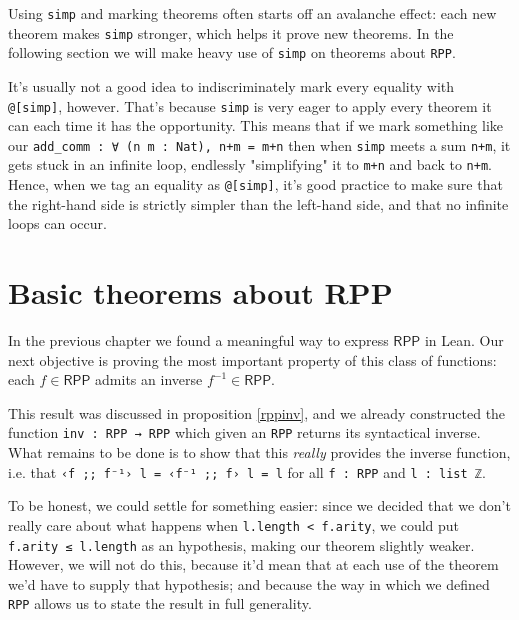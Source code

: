 \documentclass{book}
\theoremstyle{definition}
\theoremstyle{remark}
\theoremstyle{plain}
\newcommand{\RPP}{\mathsf{RPP}}
\begin{document}
Using \lstinline{simp} and marking theorems often starts off an avalanche effect:
each new theorem makes \lstinline{simp} stronger, which helps it prove new theorems.
In the following section we will make heavy use of \lstinline{simp} on theorems about \lstinline{RPP}.

It's usually not a good idea to indiscriminately mark every equality with \lstinline{@[simp]}, however.
That's because \lstinline{simp} is very eager to apply every theorem it can each time it has the opportunity.
This means that if we mark something like our \lstinline{add_comm : ∀ (n m : Nat), n+m = m+n}
then when \lstinline{simp} meets a sum \lstinline{n+m}, it gets stuck in an infinite loop,
endlessly "simplifying" it to \lstinline{m+n} and back to \lstinline{n+m}.
Hence, when we tag an equality as \lstinline{@[simp]},
it's good practice to make sure that the right-hand side is strictly simpler than the left-hand side,
and that no infinite loops can occur.

\section{Basic theorems about RPP}

In the previous chapter we found a meaningful way to express $\RPP$ in Lean.
Our next objective is proving the most important property of this class of functions:
each $f \in \RPP$ admits an inverse $f^{-1} \in \RPP$.

This result was discussed in proposition \ref{rppinv},
and we already constructed the function \lstinline{inv : RPP → RPP} which given an \lstinline{RPP} returns its syntactical inverse.
What remains to be done is to show that this \textit{really} provides the inverse function,
i.e. that \lstinline{‹f ;; f⁻¹› l = ‹f⁻¹ ;; f› l = l} for all \lstinline{f : RPP} and \lstinline{l : list ℤ}.

To be honest, we could settle for something easier:
since we decided that we don't really care about what happens when \lstinline{l.length < f.arity},
we could put \lstinline{f.arity ≤ l.length} as an hypothesis, making our theorem slightly weaker.
However, we will not do this, because it'd mean that at each use of the theorem we'd have to supply that hypothesis;
and because the way in which we defined \lstinline{RPP} allows us to state the result in full generality.
\end{document}
